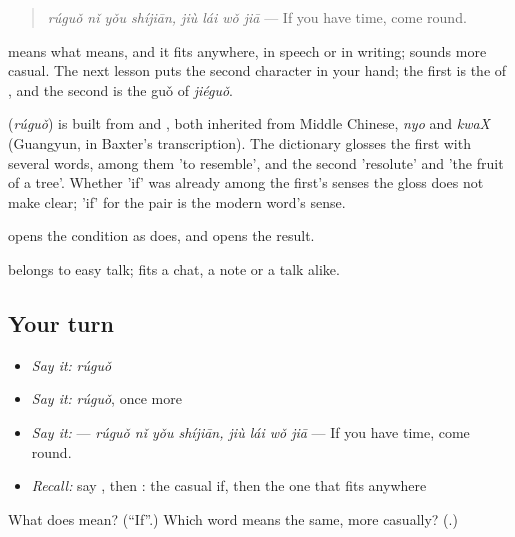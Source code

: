 \begin{quote}
\textbf{ } \emph{rúguǒ nǐ yǒu shíjiān, jiù lái wǒ jiā} — If you have time, come round.
\end{quote}

 means what  means, and it fits anywhere, in speech or in writing;  sounds more casual. The next lesson puts the second character in your hand; the first is the  of , and the second is the guǒ of \emph{jiéguǒ}.

\begin{cousinweb}
\textbf{} (\emph{rúguǒ}) is built from  and , both inherited from Middle Chinese, \emph{nyo} and \emph{kwaX} (Guangyun, in Baxter's transcription). The dictionary glosses the first with several words, among them 'to resemble', and the second 'resolute' and 'the fruit of a tree'. Whether 'if' was already among the first's senses the gloss does not make clear; 'if' for the pair is the modern word's sense.
\end{cousinweb}

\begin{grammarlens}[title={What you've built}]
 opens the condition as  does, and  opens the result.

 belongs to easy talk;  fits a chat, a note or a talk alike.
\end{grammarlens}

\subsection*{Your turn}
\begin{itemize}
\raggedright
  \item \emph{Say it:} \emph{rúguǒ}
  \item \emph{Say it:} \emph{rúguǒ}, once more
  \item \emph{Say it:}   — \emph{rúguǒ nǐ yǒu shíjiān, jiù lái wǒ jiā} — If you have time, come round.
  \item \emph{Recall:} say , then : the casual if, then the one that fits anywhere
\end{itemize}

\begin{tcolorbox}[breakable,colback=teal!4,colframe=teal!35!black,title={Before you move on}]
What does  mean? (\textquotedblleft{}If\textquotedblright{}.) Which word means the same, more casually? (\textbf{}.)
\end{tcolorbox}
